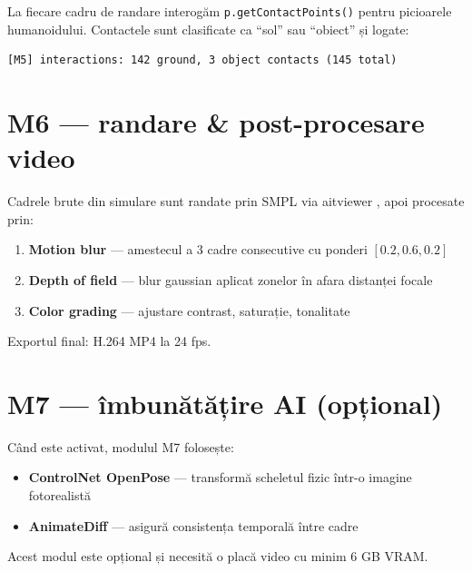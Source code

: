 La fiecare cadru de randare interogăm \texttt{p.getContactPoints()} pentru picioarele humanoidului.  Contactele sunt clasificate ca ``sol'' sau ``obiect'' și logate:

\begin{verbatim}
[M5] interactions: 142 ground, 3 object contacts (145 total)
\end{verbatim}

\section{M6 --- randare \& post-procesare video}

Cadrele brute din simulare sunt randate prin SMPL \cite{loper2015smpl} via aitviewer \cite{kaufmann2023aitviewer}, apoi procesate prin:
\begin{enumerate}
    \item \textbf{Motion blur} --- amestecul a 3 cadre consecutive cu ponderi $[0.2, 0.6, 0.2]$
    \item \textbf{Depth of field} --- blur gaussian aplicat zonelor în afara distanței focale
    \item \textbf{Color grading} --- ajustare contrast, saturație, tonalitate
\end{enumerate}

Exportul final: H.264 MP4 la 24 fps.

\section{M7 --- îmbunătățire AI (opțional)}

Când este activat, modulul M7 folosește:
\begin{itemize}
    \item \textbf{ControlNet OpenPose} \cite{zhang2023controlnet} --- transformă scheletul fizic într-o imagine fotorealistă
    \item \textbf{AnimateDiff} \cite{guo2023animatediff} --- asigură consistența temporală între cadre
\end{itemize}

Acest modul este opțional și necesită o placă video cu minim 6 GB VRAM.
